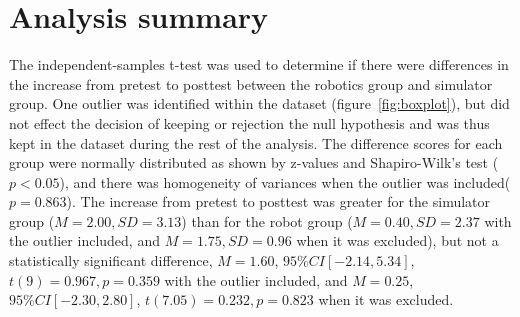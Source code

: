 \bigskip\noindent
{}

\section{Analysis summary}
The independent-samples t-test was used to determine if there were differences in the increase from pretest to posttest between the robotics group and simulator group. One outlier was identified within the dataset (figure~\ref{fig:boxplot}), but did not effect the decision of keeping or rejection the null hypothesis and was thus kept in the dataset during the rest of the analysis. The difference scores for each group were normally distributed as shown by z-values and Shapiro-Wilk's test ($p < 0.05$), and there was homogeneity of variances when the outlier was included($p = 0.863$). The increase from pretest to posttest was greater for the simulator group ($M = 2.00, SD = 3.13$) than for the robot group ($M = 0.40, SD = 2.37$ with the outlier included, and $M=1.75, SD = 0.96$ when it was excluded), but not a statistically significant difference, $M = 1.60$, $95\% CI [-2.14, 5.34]$, $t(9) = 0.967, p = 0.359$ with the outlier included, and $M = 0.25$, $95\% CI [-2.30, 2.80]$, $t(7.05) = 0.232, p = 0.823$ when it was excluded.
